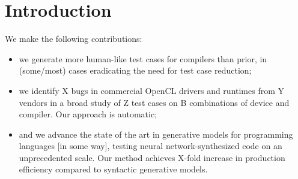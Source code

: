 \section{Introduction}\label{sec:intro}

 We make the following contributions:
%
\begin{itemize}
\item we generate more human-like test cases for compilers than prior, in (some/most) cases eradicating the need for test case reduction;
\item we identify X bugs in commercial OpenCL drivers and runtimes from Y vendors in a broad study of Z test cases on B combinations of device and compiler. Our approach is automatic;
\item and we advance the state of the art in generative models for programming languages [in some way], testing neural network-synthesized code on an unprecedented scale. Our method achieves X-fold increase in production efficiency compared to syntactic generative models.
\end{itemize}
